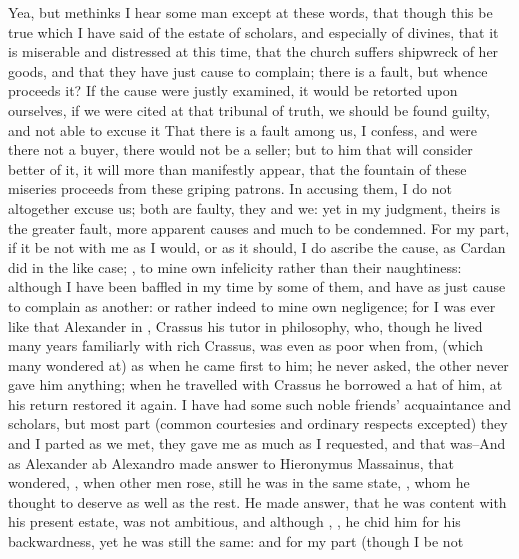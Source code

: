 Yea, but methinks I hear some man except at these words, that though this be
true which I have said of the estate of scholars, and especially of divines,
that it is miserable and distressed at this time, that the church suffers
shipwreck of her goods, and that they have just cause to complain; there is a
fault, but whence proceeds it? If the cause were justly examined, it would be
retorted upon ourselves, if we were cited at that tribunal of truth, we should
be found guilty, and not able to excuse it That there is a fault among us, I
confess, and were there not a buyer, there would not be a seller; but to him
that will consider better of it, it will more than manifestly appear, that the
fountain of these miseries proceeds from these griping patrons. In accusing
them, I do not altogether excuse us; both are faulty, they and we: yet in my
judgment, theirs is the greater fault, more apparent causes and much to be
condemned. For my part, if it be not with me as I would, or as it should, I do
ascribe the cause, as Cardan did in the like case; , to mine own
infelicity rather than their naughtiness: although I have been baffled in my
time by some of them, and have as just cause to complain as another: or rather
indeed to mine own negligence; for I was ever like that Alexander in
\Plutarch{}, Crassus his tutor in philosophy, who, though he
lived many years familiarly with rich Crassus, was even as poor when from,
(which many wondered at) as when he came first to him; he never asked, the
other never gave him anything; when he travelled with Crassus he borrowed a hat
of him, at his return restored it again. I have had some such noble friends'
acquaintance and scholars, but most part (common courtesies and ordinary
respects excepted) they and I parted as we met, they gave me as much as I
requested, and that was--And as Alexander ab Alexandro
 made answer to Hieronymus
Massainus, that wondered, , when other men rose, still he was in the
same state, , whom he thought to deserve as well as the rest. He made
answer, that he was content with his present estate, was not ambitious, and
although , \etc{}, he chid him for his
backwardness, yet he was still the same: and for my part (though I be not
